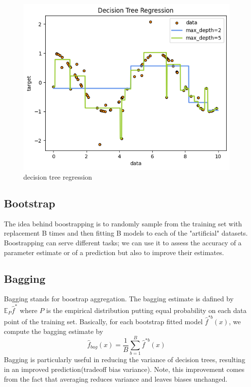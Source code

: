 \begin{figure}
    \includegraphics[width=\textwidth]{images/decision_tree.png}
    \caption{decision tree regression}
    \label{fig:decision_tree}
\end{figure}
    
\subsection{Bootstrap}
The idea behind boostrapping is to randomly sample from the training set with replacement B times and then fitting B models to each of the "artificial" datasets. Boostrapping can serve different tasks; we can use it to assess the accuracy of a parameter estimate or of a prediction but also to improve their estimates.

\subsection{Bagging}
Bagging stands for boostrap aggregation. 
The bagging estimate is dafined by $\mathbb{E}_P\hat{f}^*$ where $P$ is the empirical distribution putting equal probability on each data point of the training set.
Basically, for each bootstrap fitted model $\hat{f}^{*b}(x)$, we compute the bagging estimate by
\begin{equation}
    \hat{f}_{bag}(x)=\frac{1}{B}\sum\limits_{b=1}^{B}\hat{f}^{*b}(x)
\end{equation}
Bagging is particularly useful in reducing the variance of decision trees, resulting in an improved prediction(tradeoff bias variance).
Note, this improvement comes from the fact that averaging reduces variance and leaves biases unchanged.

